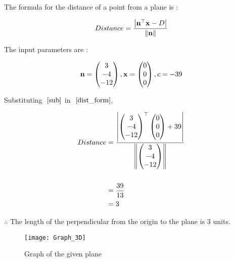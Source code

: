 \documentclass[journal,12pt,twocolumn]{IEEEtran}
\begin{document}
	
	The formula for the distance of a point from a plane is :
	
	\begin{align}
		Distance = \frac{\left\vert\mathbf{n}^\top \mathbf{x} - D\right\vert}{\left\lVert\mathbf{n}\right\rVert}
			\label{dist_form}
	\end{align}
	
	
	The input parameters are :
	
	\begin{align}
		\mathbf{n} = \begin{pmatrix}3 \\ -4 \\ -12\end{pmatrix},
		\mathbf{x} = \begin{pmatrix}0 \\ 0 \\ 0\end{pmatrix},
		c = -39
			\label{sub}
	\end{align}
	
	
	Substituting $~\eqref{sub}$ in $~\eqref{dist_form}$,
	
	\begin{align}
		Distance &= \frac{\left\vert\begin{pmatrix}3 \\ -4 \\ -12\end{pmatrix}^\top \begin{pmatrix}0 \\ 0 \\ 0\end{pmatrix} + 39\right\vert}{\left\lVert\begin{pmatrix}3 \\ -4 \\ -12\end{pmatrix}\right\rVert}  \\
				\nonumber\\
				&= \frac{39}{13} \\
				&= 3
	\end{align}
		
		
	$\therefore$ The length of the perpendicular from the origin to the plane  is \underline{$3$} units.


	\begin{figure}[h!]
		\centering
		\texttt{[image: Graph\_3D]}
		\caption{Graph of the given plane}
	\end{figure}
\end{document}
